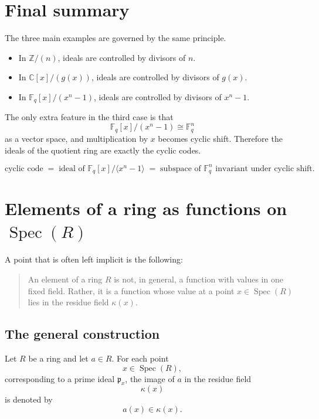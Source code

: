 \documentclass[11pt]{article}
\theoremstyle{definition}
\newcommand{\Z}{\mathbb{Z}}
\newcommand{\C}{\mathbb{C}}
\newcommand{\F}{\mathbb{F}}
\newcommand{\Spec}{\operatorname{Spec}}
\newcommand{\kk}[1]{\kappa\!\left(#1\right)}
\newcommand{\ideal}[1]{\langle #1\rangle}
\begin{document}
	\section{Final summary}
	
	The three main examples are governed by the same principle.
	
	\begin{itemize}
		\item In \(\Z/(n)\), ideals are controlled by divisors of \(n\).
		
		\item In \(\C[x]/(g(x))\), ideals are controlled by divisors of \(g(x)\).
		
		\item In \(\F_q[x]/(x^n-1)\), ideals are controlled by divisors of \(x^n-1\).
	\end{itemize}
	
	The only extra feature in the third case is that
	\[
	\F_q[x]/(x^n-1)\cong \F_q^n
	\]
	as a vector space, and multiplication by \(x\) becomes cyclic shift. Therefore the ideals of the quotient ring are exactly the cyclic codes.
	
	\begin{center}
		\[
		\boxed{
			\text{cyclic code}
			\;=\;
			\text{ideal of }\F_q[x]/\ideal{x^n-1}
			\;=\;
			\text{subspace of }\F_q^n\text{ invariant under cyclic shift}.
		}
		\]
	\end{center}

\newpage
\section{Elements of a ring as functions on \texorpdfstring{$\Spec(R)$}{Spec(R)}}

A point that is often left implicit is the following:

\begin{quote}
	An element of a ring \(R\) is not, in general, a function with values in one fixed field.  
	Rather, it is a function whose value at a point \(x\in \Spec(R)\) lies in the residue field \(\kk{x}\).
\end{quote}

\subsection{The general construction}

Let \(R\) be a ring and let \(a\in R\). For each point
\[
x\in \Spec(R),
\]
corresponding to a prime ideal \(\mathfrak p_x\), the image of \(a\) in the residue field
\[
\kk{x}
\]
is denoted by
\[
a(x)\in \kk{x}.
\]
\end{document}

